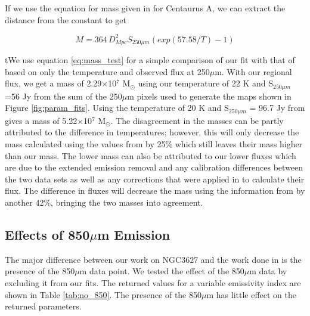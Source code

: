 If we use the equation for mass given in \cite{parkin2012} for Centaurus A, we can extract the distance from the constant to get 

\begin{equation}\label{eq:mass_test}
  M=364\,D^{2}_{Mpc}S_{250\mu m}\left(exp(57.58 / T) - 1\right)
\end{equation}

\noindent tWe use equation \ref{eq:mass_test} for a simple comparison of our fit with that of \cite{galametz2012} based on only the temperature and observed flux at 250$\mu$m.  With our regional flux, we get a mass of 2.29$\times$10$^{7}$ M$_\odot$ using our temperature of 22 K and S$_{250\mu m}$=56 Jy from the sum of the 250$\mu$m pixels used to generate the maps shown in Figure \ref{fig:param_fits}.  Using the temperature of 20 K and S$_{250\mu m}$ = 96.7 Jy from \cite{galametz2012} gives a mass of 5.22$\times$10$^7$ M$_\odot$.  The disagreement in the masses can be partly attributed to the difference in temperatures; however, this will only decrease the mass calculated using the values from \cite{galametz2012} by 25\% which still leaves their mass higher than our mass.  The lower mass can also be attributed to our lower fluxes which are due to the extended emission removal and any calibration differences between the two data sets as well as any corrections that were applied in \cite{galametz2012} to calculate their flux.  The difference in fluxes will decrease the mass using the information from \cite{galametz2012} by another 42\%, bringing the two masses into agreement.

\subsection{Effects of 850$\mu$m Emission}

The major difference between our work on NGC3627 and the work done in \cite{galametz2012} is the presence of the 850$\mu$m data point.  We tested the effect of the 850$\mu$m data by excluding it from our fits.  The returned values for a variable emissivity index are shown in Table \ref{tab:no_850}.  The presence of the 850$\mu$m has little effect on the returned parameters.  

